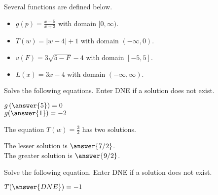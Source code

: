 \documentclass{ximera}
\begin{document}
\begin{definition}
Several functions are defined below.
\begin{itemize}
\item $g(p) = \frac{x-5}{x+3}$ with domain $[0, \infty)$. \\ \quad
\item $T(w) = | w - 4 | + 1$ with domain $(-\infty, 0)$. 
\item $v(F) = 3\sqrt{5 - F} - 4$ with domain $[-5, 5]$. 
\item $L(x) = 3x - 4$ with domain $(-\infty, \infty)$. 
\end{itemize}
\end{definition}



\begin{exercise}
Solve the following equations.  Enter DNE if a solution does not exist.

$g\left( \answer{5} \right) = 0$   \\
$g( \answer{1} ) = -2$  

\end{exercise}




\begin{exercise}
The equation $T(w) = \frac{3}{2}$ has two solutions.  

The lesser solution is $\answer{7/2} $.  \\
The greater solution is $\answer{9/2} $.

\end{exercise}



\begin{exercise}
Solve the following equation.  Enter DNE if a solution does not exist.

$T( \answer{DNE} ) = -1$   


\end{exercise}
\end{document}
